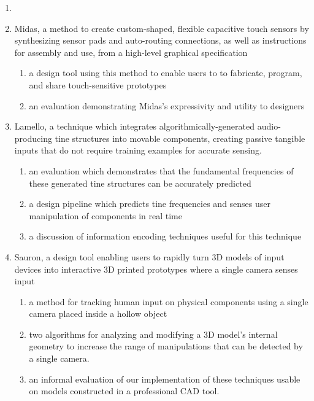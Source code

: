 \begin{enumerate}
\item {}
\item Midas, a method to create custom-shaped, flexible capacitive touch sensors by synthesizing sensor pads and auto-routing connections, as well as instructions for assembly and use, from a high-level graphical specification \begin{enumerate}
    \item a design tool using this method to enable users to to fabricate, program, and share touch-sensitive prototypes
    \item an evaluation demonstrating Midas’s expressivity and utility to designers
    \end{enumerate}
\item Lamello, a technique which integrates algorithmically-generated audio-producing tine structures into movable components, creating passive tangible inputs that do not require training examples for accurate sensing. \begin{enumerate}
    \item an evaluation which demonstrates that the fundamental frequencies of these generated tine structures can be accurately predicted
    \item a design pipeline which predicts tine frequencies and senses user manipulation of components in real time
    \item a discussion of information encoding techniques useful for this technique 
    \end{enumerate}
\item Sauron, a design tool enabling users to
rapidly turn 3D models of input devices into interactive 3D printed prototypes where a single camera senses input \begin{enumerate}
    \item a method for tracking human input on physical components using a single camera placed inside a hollow object
    \item two algorithms for analyzing and modifying a 3D model’s internal geometry to increase the range of manipulations that can be detected by a single camera.
    \item an informal evaluation of our implementation of these techniques usable on models constructed in a professional CAD tool.
    \end{enumerate}
\end{enumerate}

